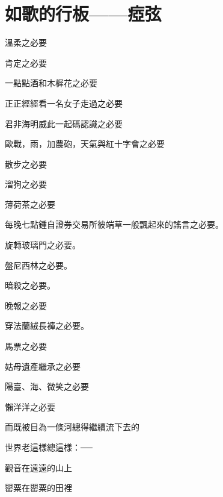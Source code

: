 \section{如歌的行板——瘂弦}

溫柔之必要

肯定之必要

一點點酒和木樨花之必要

正正經經看一名女子走過之必要

君非海明威此一起碼認識之必要

歐戰，雨，加農砲，天氣與紅十字會之必要

散步之必要

溜狗之必要

薄荷茶之必要

每晚七點鍾自證券交易所彼端草一般飄起來的謠言之必要。

旋轉玻璃門之必要。

盤尼西林之必要。

暗殺之必要。

晚報之必要

穿法蘭絨長褲之必要。

馬票之必要

姑母遺產繼承之必要

陽臺、海、微笑之必要

懶洋洋之必要


而既被目為一條河總得繼續流下去的

世界老這樣總這樣：──

觀音在遠遠的山上

罌粟在罌粟的田裡